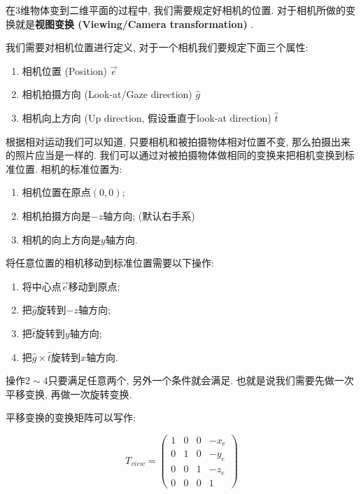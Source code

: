 在$3$维物体变到二维平面的过程中, 我们需要规定好相机的位置. 对于相机所做的变换就是\textbf{视图变换 (Viewing/Camera transformation) }. 

\vspace{\baselineskip}
我们需要对相机位置进行定义, 对于一个相机我们要规定下面三个属性: 
\begin{enumerate}[itemsep=-0.5em]
	\item 相机位置 (Position) $\overrightarrow{e}$
	\item 相机拍摄方向 (Look-at/Gaze direction) $\hat{g}$
	\item 相机向上方向 (Up direction, 假设垂直于look-at direction) $\hat{t}$
\end{enumerate}

\vspace{\baselineskip}
根据相对运动我们可以知道, 只要相机和被拍摄物体相对位置不变, 那么拍摄出来的照片应当是一样的. 我们可以通过对被拍摄物体做相同的变换来把相机变换到标准位置. 相机的标准位置为: 
\begin{enumerate}[itemsep=-0.5em]
	\item 相机位置在原点$(0,0)$; 
	\item 相机拍摄方向是$-z$轴方向; (默认右手系)
	\item 相机的向上方向是$y$轴方向. 
\end{enumerate}

\vspace{\baselineskip}
将任意位置的相机移动到标准位置需要以下操作: 
\begin{enumerate}[itemsep=-0.5em]
	\item 将中心点$\overrightarrow{e}$移动到原点; 
	\item 把$\hat{g}$旋转到$-z$轴方向; 
	\item 把$\hat{t}$旋转到$y$轴方向; 
	\item 把$\hat{g}\times\hat{t}$旋转到$x$轴方向. 
\end{enumerate}

操作$2 \sim 4$只要满足任意两个, 另外一个条件就会满足. 也就是说我们需要先做一次平移变换, 再做一次旋转变换. 

平移变换的变换矩阵可以写作: 

\begin{equation}
	T_{view}=\begin{pmatrix}1&0&0&-x_e\\0&1&0&-y_e\\0&0&1&-z_e\\0&0&0&1\end{pmatrix}
\end{equation}

